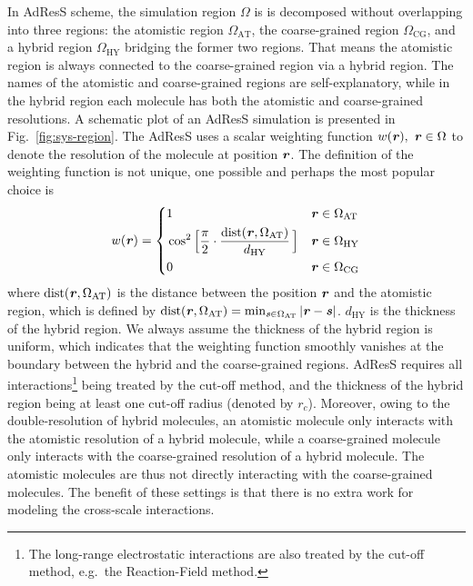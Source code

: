 \documentclass[epjST]{svjour}
\newcommand{\vect}[1]{\textbf{\textit{#1}}}
\newcommand{\dist}[0]{\textrm {dist}}
\newcommand{\AT}[0]{\textrm{AT}}
\newcommand{\HY}[0]{\textrm{HY}}
\newcommand{\CG}[0]{\textrm{CG}}
\begin{document}
In AdResS scheme, the simulation region $\Omega$ is 
is decomposed without overlapping into three regions:
the atomistic region $\Omega_\AT$, the coarse-grained region $\Omega_\CG$, and
a hybrid region $\Omega_\HY$ bridging the former two regions.
That means the atomistic region is always connected to the coarse-grained region via a hybrid region.
The names of the atomistic and coarse-grained regions are self-explanatory, while
in the hybrid region each molecule has both the atomistic and coarse-grained resolutions.
A schematic plot of an AdResS simulation is presented in Fig.~\ref{fig:sys-region}.
The AdResS uses a scalar weighting function $w(\vect r),\ \vect r\in\Omega$ 
to denote the resolution of the molecule at position $\vect r$.
The definition of the weighting function
is not unique, one possible and perhaps the most popular choice is
\begin{equation}\label{eqn:old-w}
  w(\vect r) =
  \left\{
    \begin{alignedat}{3}
      &1 &\quad& \vect r \in \Omega_\AT\\
      &\cos^2\Big[\frac{\pi}{2 } \cdot \frac{\dist(\vect r, \Omega_\AT)}{d_\HY}\,\Big] && \vect r \in\Omega_\HY \\
      &0 &    & \vect r \in \Omega_\CG 
    \end{alignedat}
  \right.
\end{equation}
where $\dist(\vect r, \Omega_\AT)$ is the distance between the
position $\vect r$ and the atomistic region, which is defined
by $\dist(\vect r, \Omega_\AT) = \min_{\vect s\in\Omega_\AT} \vert
\vect r - \vect s \vert$.  $d_\HY$ is the thickness of the hybrid
region. We always assume the thickness of the hybrid region is
uniform, which indicates that the weighting function smoothly vanishes
at the boundary between the hybrid and the coarse-grained regions.
AdResS requires 
all interactions\footnote{The long-range electrostatic interactions
  are also treated by the cut-off method, e.g.~the Reaction-Field method.
} being treated
by the cut-off method, and the thickness of
the hybrid region being at least one cut-off radius (denoted by $r_c$).
Moreover, owing to the double-resolution of hybrid molecules,
an atomistic molecule only interacts with the 
atomistic resolution of a hybrid molecule,
while a coarse-grained molecule only interacts with the coarse-grained resolution
of a hybrid molecule.
The atomistic molecules are thus not directly interacting with the coarse-grained molecules.
The benefit of these settings is that
there is no extra work for modeling the cross-scale interactions.
\end{document}
